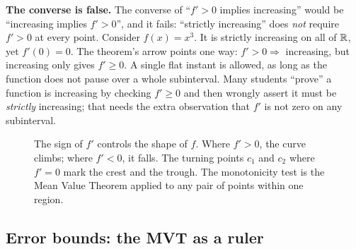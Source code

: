 \begin{trapbox}
\textbf{The converse is false.} The converse of ``$f'>0$ implies increasing'' would
be ``increasing implies $f'>0$'', and it fails: ``strictly increasing'' does
\emph{not} require $f'>0$ at every point. Consider $f(x)=x^3$. It is strictly
increasing on all of $\mathbb{R}$, yet $f'(0)=0$. The theorem's arrow points one way:
$f'>0\Rightarrow$ increasing, but increasing only gives $f'\ge 0$. A single flat
instant is allowed, as long as the function does not pause over a whole
subinterval. Many students ``prove'' a function is increasing by checking $f'\ge 0$
and then wrongly assert it must be \emph{strictly} increasing; that needs the extra
observation that $f'$ is not zero on any subinterval.
\end{trapbox}

\begin{figure}[H]
\centering
{}
\caption{The sign of $f'$ controls the shape of $f$. Where $f'>0$, the curve climbs;
where $f'<0$, it falls. The turning points $c_1$ and $c_2$ where $f'=0$ mark the crest
and the trough. The monotonicity test is the Mean Value Theorem applied to
any pair of points within one region.}
\label{ch15:fig-mono}
\end{figure}

\subsection{Error bounds: the MVT as a ruler}

